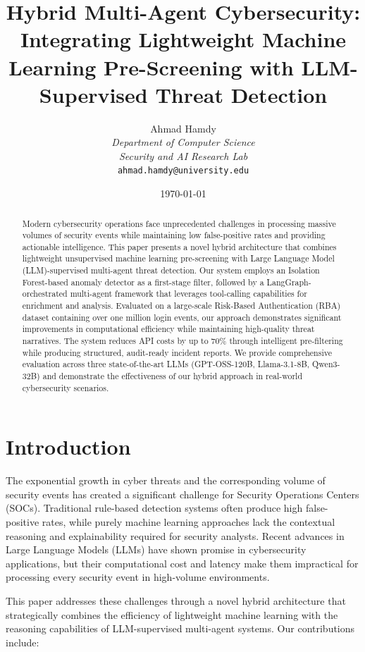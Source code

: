 \documentclass[11pt,twocolumn]{article}
\title{Hybrid Multi-Agent Cybersecurity: Integrating Lightweight Machine Learning Pre-Screening with LLM-Supervised Threat Detection}
\author{
Ahmad Hamdy \\
\textit{Department of Computer Science} \\
\textit{Security and AI Research Lab} \\
\texttt{ahmad.hamdy@university.edu}
}
\date{\today}
\begin{document}
\maketitle

\begin{abstract}
Modern cybersecurity operations face unprecedented challenges in processing massive volumes of security events while maintaining low false-positive rates and providing actionable intelligence. This paper presents a novel hybrid architecture that combines lightweight unsupervised machine learning pre-screening with Large Language Model (LLM)-supervised multi-agent threat detection. Our system employs an Isolation Forest-based anomaly detector as a first-stage filter, followed by a LangGraph-orchestrated multi-agent framework that leverages tool-calling capabilities for enrichment and analysis. Evaluated on a large-scale Risk-Based Authentication (RBA) dataset containing over one million login events, our approach demonstrates significant improvements in computational efficiency while maintaining high-quality threat narratives. The system reduces API costs by up to 70\% through intelligent pre-filtering while producing structured, audit-ready incident reports. We provide comprehensive evaluation across three state-of-the-art LLMs (GPT-OSS-120B, Llama-3.1-8B, Qwen3-32B) and demonstrate the effectiveness of our hybrid approach in real-world cybersecurity scenarios.
\end{abstract}

\section{Introduction}

The exponential growth in cyber threats and the corresponding volume of security events has created a significant challenge for Security Operations Centers (SOCs). Traditional rule-based detection systems often produce high false-positive rates, while purely machine learning approaches lack the contextual reasoning and explainability required for security analysts. Recent advances in Large Language Models (LLMs) have shown promise in cybersecurity applications, but their computational cost and latency make them impractical for processing every security event in high-volume environments.

This paper addresses these challenges through a novel hybrid architecture that strategically combines the efficiency of lightweight machine learning with the reasoning capabilities of LLM-supervised multi-agent systems. Our contributions include:
\end{document}
